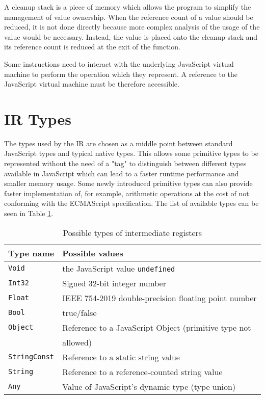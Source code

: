 A cleanup stack is a piece of memory which allows the program to simplify the management of value ownership. When the reference count of a value should be reduced, it is not done directly because more complex analysis of the usage of the value would be necessary. Instead, the value is placed onto the cleanup stack and its reference count is reduced at the exit of the function.

Some instructions need to interact with the underlying JavaScript virtual machine to perform the operation which they represent. A reference to the JavaScript virtual machine must be therefore accessible.


\section{IR Types}\label{ir:types}

The types used by the IR are chosen as a middle point between standard JavaScript types and typical native types. This allows some primitive types to be represented without the need of a "tag" to distinguish between different types available in JavaScript which can lead to a faster runtime performance and smaller memory usage. Some newly introduced primitive types can also provide faster implementation of, for example, arithmetic operations at the cost of not conforming with the ECMAScript specification. The list of available types can be seen in Table \ref{tab:types}.

\begin{table}[H]
    \centering
    \begin{tabular}{l | l}
        Type name   & Possible values                                                \\\hline
        \texttt{Void}        & the JavaScript value \texttt{undefined}                        \\
        \texttt{Int32}       & Signed 32-bit integer number                                   \\
        \texttt{Float}       & IEEE 754-2019 double-precision floating point number          \\
        \texttt{Bool}        & true/false                                                     \\
        \texttt{Object}      & Reference to a JavaScript Object (primitive type not \\
                             & allowed)  \\
        \texttt{StringConst} & Reference to a static string value                             \\
        \texttt{String}      & Reference to a reference-counted string value                  \\
        \texttt{Any}         & Value of JavaScript's dynamic type (type union)
    \end{tabular}
    \caption{Possible types of intermediate registers}
    \label{tab:types}
\end{table}


